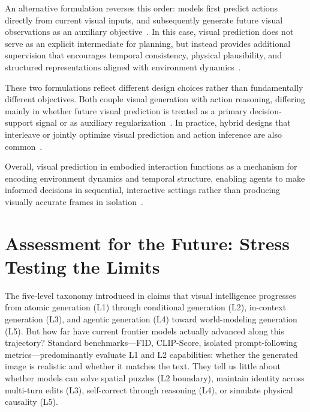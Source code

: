 \documentclass{llmxive}
\begin{document}
An alternative formulation reverses this order: models first predict actions directly from current visual inputs, and subsequently generate future visual observations as an auxiliary objective~\citep{li2025uva,zhu2025uwm,liang2025videopolicy,shen2025videovla,hu2024vpp}. In this case, visual prediction does not serve as an explicit intermediate for planning, but instead provides additional supervision that encourages temporal consistency, physical plausibility, and structured representations aligned with environment dynamics~\citep{li2025uva,zhu2025uwm}.

These two formulations reflect different design choices rather than fundamentally different objectives. Both couple visual generation with action reasoning, differing mainly in whether future visual prediction is treated as a primary decision-support signal or as auxiliary regularization~\citep{tian2024predictive,li2025uva,zhu2025uwm}. In practice, hybrid designs that interleave or jointly optimize visual prediction and action inference are also common~\citep{li2025uva,zhu2025uwm,liang2025videopolicy,shen2025videovla}.

Overall, visual prediction in embodied interaction functions as a mechanism for encoding environment dynamics and temporal structure, enabling agents to make informed decisions in sequential, interactive settings rather than producing visually accurate frames in isolation~\citep{meietal2026videoroboticsurvey,hu2024vpp,li2025uva}.




\section{Assessment for the Future: Stress Testing the Limits}
\label{sec:stress_test}



The five-level taxonomy introduced in  claims that visual intelligence progresses from atomic generation (L1) through conditional generation (L2), in-context generation (L3), and agentic generation (L4) toward world-modeling generation (L5). But how far have current frontier models actually advanced along this trajectory? Standard benchmarks---FID, CLIP-Score, isolated prompt-following metrics---predominantly evaluate L1 and L2 capabilities: whether the generated image is realistic and whether it matches the text. They tell us little about whether models can solve spatial puzzles (L2 boundary), maintain identity across multi-turn edits (L3), self-correct through reasoning (L4), or simulate physical causality (L5).
\end{document}
